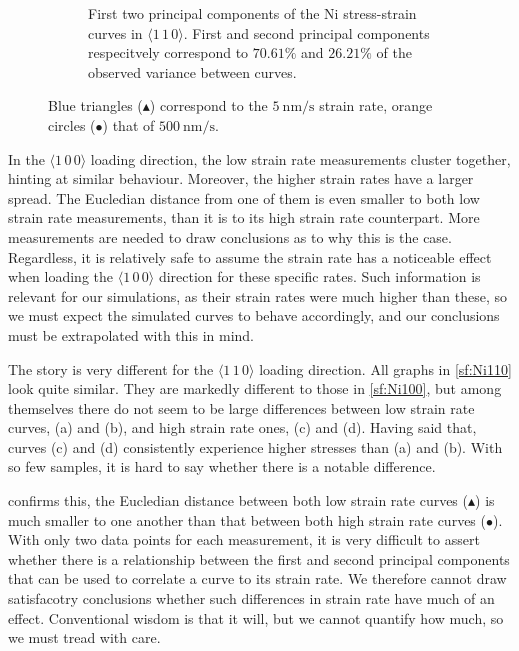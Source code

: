 \begin{figure}
\begin{subfigure}[t]{0.45\linewidth}
        \caption[First two principal components of the Ni stress-strain curves in $\langle 1\,1\,0 \rangle$.]{First two principal components of the Ni stress-strain curves in $\langle 1\,1\,0 \rangle$. First and second principal components respecitvely correspond to $70.61\%$ and $26.21\%$ of the observed variance between curves.}
        \label{sf:Ni110_pca}
    \end{subfigure}
    \caption{Blue triangles (\textcolor{matlabBlue}{$\blacktriangle$}) correspond to the $\SI{5}{\nano\metre\per\second}$ strain rate, orange circles (\textcolor{matlabOrange}{$\bullet$}) that of $\SI{500}{\nano\metre\per\second}$.}
    \label{f:Ni_pca}
\end{figure}

In the $\langle 1\, 0\, 0 \rangle$ loading direction, the low strain rate measurements cluster together, hinting at similar behaviour. Moreover, the higher strain rates have a larger spread. The Eucledian distance from one of them is even smaller to both low strain rate measurements, than it is to its high strain rate counterpart. More measurements are needed to draw conclusions as to why this is the case. Regardless, it is relatively safe to assume the strain rate has a noticeable effect when loading the $\langle 1\, 0\, 0 \rangle$ direction for these specific rates. Such information is relevant for our simulations, as their strain rates were much higher than these, so we must expect the simulated curves to behave accordingly, and our conclusions must be extrapolated with this in mind.

The story is very different for the $\langle 1\, 1\, 0 \rangle$ loading direction. All graphs in \cref{sf:Ni110} look quite similar. They are markedly different to those in \cref{sf:Ni100}, but among themselves there do not seem to be large differences between low strain rate curves, (a) and (b), and high strain rate ones, (c) and (d). Having said that, curves (c) and (d) consistently experience higher stresses than (a) and (b). With so few samples, it is hard to say whether there is a notable difference.

 confirms this, the Eucledian distance between both low strain rate curves (\textcolor{matlabBlue}{$\blacktriangle$}) is much smaller to one another than that between both high strain rate curves (\textcolor{matlabOrange}{$\bullet$}). With only two data points for each measurement, it is very difficult to assert whether there is a relationship between the first and second principal components that can be used to correlate a curve to its strain rate. We therefore cannot draw satisfacotry conclusions whether such differences in strain rate have much of an effect. Conventional wisdom is that it will, but we cannot quantify how much, so we must tread with care.

